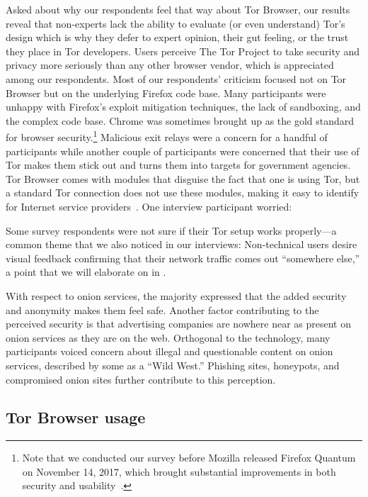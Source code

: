 Asked about why our respondents feel that way about Tor Browser, our results
reveal that non-experts lack the ability to evaluate (or even understand) Tor's
design which is why they defer to expert opinion, their gut feeling, or the
trust they place in Tor developers.  Users perceive The Tor Project to take
security and privacy more seriously than any other browser vendor, which is
appreciated among our respondents.  Most of our respondents' criticism focused
not on Tor Browser but on the underlying Firefox code base.  Many participants
were unhappy with Firefox's exploit mitigation techniques, the lack of
sandboxing, and the complex code base.  Chrome was sometimes brought up as the
gold standard for browser security.\footnote{Note that we conducted our survey
before Mozilla released Firefox Quantum on November 14, 2017, which brought
substantial improvements in both security and usability~\cite{firefox-quantum}.}
Malicious exit relays were a concern for a handful of participants while another
couple of participants were concerned that their use of Tor makes them stick out
and turns them into targets for government agencies.  Tor Browser comes with
modules that disguise the fact that one is using Tor, but a standard Tor
connection does not use these modules, making it easy to identify for Internet
service providers~\cite{pluggable}.  One interview participant worried:

Some survey respondents were not sure if their Tor setup works properly---a
common theme that we also noticed in our interviews: Non-technical users desire
visual feedback confirming that their network traffic comes out ``somewhere
else,'' a point that we will elaborate on in .

With respect to onion services, the majority expressed that the added security
and anonymity makes them feel safe.  Another factor contributing to the
perceived security is that advertising companies are nowhere near as present on
onion services as they are on the web.  Orthogonal to the technology, many
participants voiced concern about illegal and questionable content on onion
services, described by some as a ``Wild West.''  Phishing sites, honeypots, and
compromised onion sites further contribute to this perception.

\subsection{Tor Browser usage}

